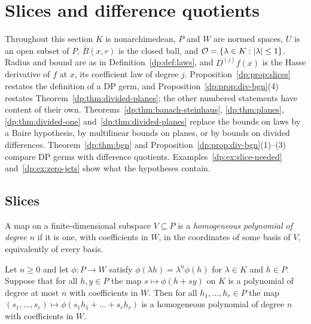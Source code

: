 \section{Slices and difference quotients}\label{dp:sec:quotients}

Throughout this section $K$ is nonarchimedean, $P$ and $W$ are normed spaces, $U$ is an open subset of $P$, $\bar B(x,r)$ is the closed ball, and $\mathcal O=\{\lambda\in K:\lvert \lambda\rvert\le1\}$. Radius and bound are as in Definition~\ref{dp:def:laws}, and $D^{(j)}f(x)$ is the Hasse derivative of $f$ at $x$, its coefficient law of degree $j$. Proposition~\ref{dp:prop:slices} restates the definition of a DP germ, and Proposition~\ref{dp:prop:div-bgn}(4) restates Theorem~\ref{dp:thm:divided-planes}; the other numbered statements have content of their own. Theorems~\ref{dp:thm:banach-steinhaus}, \ref{dp:thm:planes}, \ref{dp:thm:divided-one} and~\ref{dp:thm:divided-planes} replace the bounds on laws by a Baire hypothesis, by multilinear bounds on planes, or by bounds on divided differences. Theorem~\ref{dp:thm:bgn} and Proposition~\ref{dp:prop:div-bgn}(1)--(3) compare DP germs with difference quotients. Examples~\ref{dp:ex:slice-needed} and~\ref{dp:ex:zero-jets} show what the hypotheses contain.

\subsection{Slices}\label{dp:sq:ssec-slices}

A map on a finite-dimensional subspace $V\subseteq P$ is a \emph{homogeneous polynomial of degree $n$} if it is one, with coefficients in $W$, in the coordinates of some basis of $V$, equivalently of every basis.

\begin{lemma}\label{dp:sq:lines}
Let $n\ge0$ and let $\phi\colon P\to W$ satisfy $\phi(\lambda h)=\lambda^n\phi(h)$ for $\lambda\in K$ and $h\in P$. Suppose that for all $h,y\in P$ the map $s\mapsto\phi(h+sy)$ on $K$ is a polynomial of degree at most $n$ with coefficients in $W$. Then for all $h_1,\dots,h_r\in P$ the map $(s_1,\dots,s_r)\mapsto\phi(s_1h_1+\dots+s_rh_r)$ is a homogeneous polynomial of degree $n$ with coefficients in $W$.
\end{lemma}


